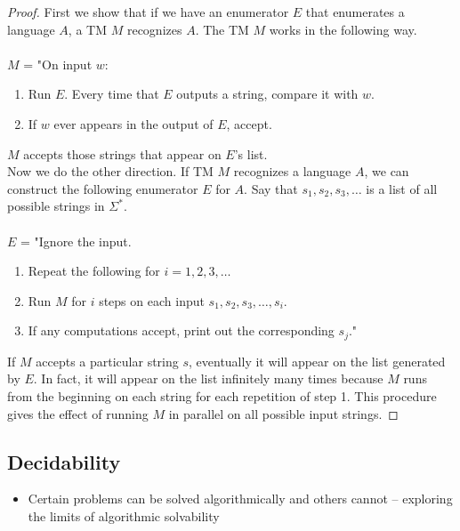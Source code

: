 \documentclass[11pt]{article}
\theoremstyle{definition}
\begin{document}
\begin{proof}
First we show that if we have an enumerator $E$ that enumerates a language $A$, a TM $M$ recognizes $A$. The TM $M$ works in the following way.\\\\
    $M$ = "On input $w$:
    \begin{enumerate}
        \item Run $E$. Every time that $E$ outputs a string, compare it with $w$.
        \item If $w$ ever appears in the output of $E$, accept.
    \end{enumerate}
$M$ accepts those strings that appear on $E$'s list.\\
Now we do the other direction. If TM $M$ recognizes a language $A$, we can construct the following enumerator $E$ for $A$. Say that $s_1,s_2,s_3,\ldots$ is a list of all possible strings in $\Sigma^*$.\\\\
$E$ = "Ignore the input.
\begin{enumerate}
    \item Repeat the following for $i = 1, 2, 3, \ldots$
    \item Run $M$ for $i$ steps on each input $s_1,s_2,s_3,\ldots, s_i$.
    \item If any computations accept, print out the corresponding $s_j$."
\end{enumerate}
If $M$ accepts a particular string $s$, eventually it will appear on the list generated by $E$. In fact, it will appear on the list infinitely many times because $M$ runs from the beginning on each string for each repetition of step 1. This procedure gives the effect of running $M$ in parallel on all possible input strings.
\end{proof}


\subsection{Decidability}
\begin{itemize}[leftmargin=*]
    \item Certain problems can be solved algorithmically and others cannot -- exploring the limits of algorithmic solvability
\end{itemize}
\end{document}
